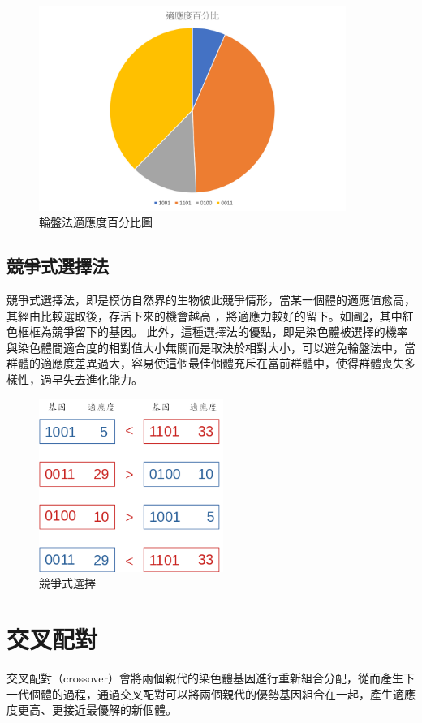 \begin{figure}[H]
	\centerline{\includegraphics[width=10cm]{pic/wheelFitness.png}}
	\caption{輪盤法適應度百分比圖}
	\label{fig:WheelMethodPercentage}
\end{figure}


\subsection{競爭式選擇法}
競爭式選擇法，即是模仿自然界的生物彼此競爭情形，當某一個體的適應值愈高，其經由比較選取後，存活下來的機會越高
，將適應力較好的留下。如圖\ref{fig:TournamentSelection}，其中紅色框框為競爭留下的基因。
此外，這種選擇法的優點，即是染色體被選擇的機率與染色體間適合度的相對值大小無關而是取決於相對大小，可以避免輪盤法中，當群體的適應度差異過大，容易使這個最佳個體充斥在當前群體中，使得群體喪失多樣性，過早失去進化能力。


\begin{figure}[H]
	\centerline{\includegraphics[width=6cm]{./pic/us1jJ97T.png}}
	\caption{競爭式選擇}
	\label{fig:TournamentSelection}
\end{figure}

\newpage
\section{交叉配對}
交叉配對（crossover）會將兩個親代的染色體基因進行重新組合分配，從而產生下一代個體的過程，通過交叉配對可以將兩個親代的優勢基因組合在一起，產生適應度更高、更接近最優解的新個體。

